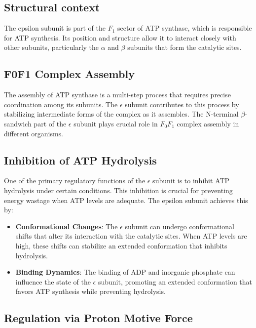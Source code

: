 \documentclass{article}
\begin{document}
\subsection{Structural context}

The epsilon subunit is part of the \textit{$F_1$} sector of ATP synthase, which is responsible for ATP synthesis. Its position and structure allow it to interact closely with other subunits, particularly the $\alpha$ and $\beta$ subunits that form the catalytic sites.

\subsection{F0F1 Complex Assembly}

The assembly of ATP synthase is a multi-step process that requires precise coordination among its subunits. The $\epsilon$ subunit contributes to this process by stabilizing intermediate forms of the complex as it assembles.
The N-terminal $\beta$-sandwich part of the $\epsilon$ subunit plays crucial role in \textit{$F_0F_1$} complex assembly in different organisms.

\subsection{Inhibition of ATP Hydrolysis}

One of the primary regulatory functions of the $\epsilon$ subunit is to inhibit ATP hydrolysis under certain conditions. This inhibition is crucial for preventing energy wastage when ATP levels are adequate. The epsilon subunit achieves this by:

\begin{itemize}
    \item  \textbf{Conformational Changes}: The $\epsilon$ subunit can undergo conformational shifts that alter its interaction with the catalytic sites. When ATP levels are high, these shifts can stabilize an extended conformation that inhibits hydrolysis.
    \item  \textbf{Binding Dynamics}: The binding of ADP and inorganic phosphate can influence the state of the $\epsilon$ subunit, promoting an extended conformation that favors ATP synthesis while preventing hydrolysis.
\end{itemize}

\subsection{Regulation via Proton Motive Force}
\end{document}
